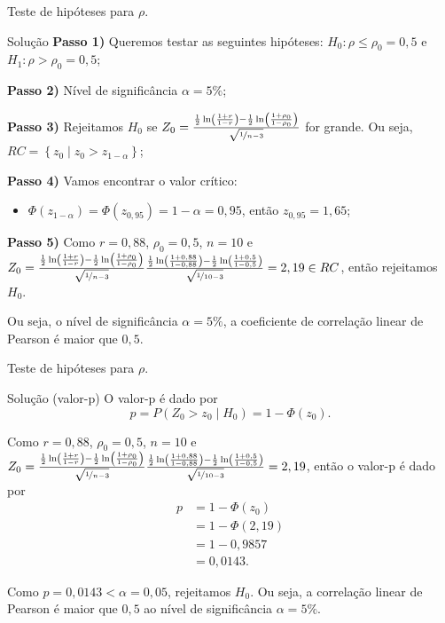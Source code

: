 \documentclass[9pt]{beamer}
\begin{document}
\begin{frame}{Teste de hipóteses para $\rho$.}

\begin{block}{Solução}
	\textbf{Passo 1)} Queremos testar as seguintes hipóteses: $H_0: \rho \leq \rho_0= 0,5$ e $H_1: \rho > \rho_0= 0,5$;
	
	\textbf{Passo 2)} Nível de significância $\alpha=5\%$;
	
	\textbf{Passo 3)} Rejeitamos $H_0$ se $Z_0 =  \frac{\frac{1}{2} \ln\left( \frac{1+r}{1-r} \right) - \frac{1}{2} \ln\left( \frac{1 + \rho_0}{1 - \rho_0} \right) }{\sqrt{\nicefrac{1}{n - 3}}}$ for grande. Ou seja, $RC = \left\{ z_0 \mid z_0 > z_{1-\alpha} \right\}$;
	
	\textbf{Passo 4)} Vamos encontrar o valor crítico:
	\begin{itemize}
		\item $\Phi\left( z_{1-\alpha} \right) = \Phi\left( z_{0,95} \right) = 1-\alpha = 0,95$, então $z_{0,95} = 1,65$;
	\end{itemize}

	\textbf{Passo 5)} Como $r = 0,88$, $\rho_0 = 0,5$, $n = 10$ e $Z_0 =  \frac{\frac{1}{2} \ln\left( \frac{1+r}{1-r} \right) - \frac{1}{2} \ln\left( \frac{1 + \rho_0}{1 - \rho_0} \right) }{\sqrt{\nicefrac{1}{n - 3}}}\allowbreak \frac{\frac{1}{2} \ln\left( \frac{1 + 0,88}{1 - 0,88} \right) - \frac{1}{2} \ln\left( \frac{1 + 0,5}{1 - 0,5} \right) }{\sqrt{\nicefrac{1}{10 - 3}}} = 2, 19 \in RC$, então rejeitamos $H_0$.
	
	Ou seja, o nível de significância $\alpha=5\%$, a coeficiente de correlação linear de Pearson é maior que $0,5$.
\end{block}

\end{frame}

\begin{frame}{Teste de hipóteses para $\rho$.}

\begin{block}{Solução (valor-p)}
	O valor-p é dado por
	$$p = P(Z_0 > z_0 \mid H_0) = 1 - \Phi(z_0).$$
	
	 Como $r = 0,88$, $\rho_0 = 0,5$, $n = 10$ e $Z_0 =  \frac{\frac{1}{2} \ln\left( \frac{1+r}{1-r} \right) - \frac{1}{2} \ln\left( \frac{1 + \rho_0}{1 - \rho_0} \right) }{\sqrt{\nicefrac{1}{n - 3}}}\allowbreak \frac{\frac{1}{2} \ln\left( \frac{1 + 0,88}{1 - 0,88} \right) - \frac{1}{2} \ln\left( \frac{1 + 0,5}{1 - 0,5} \right) }{\sqrt{\nicefrac{1}{10 - 3}}} = 2, 19$, então o valor-p é dado por
	 \begin{align*}
		 p &= 1 - \Phi(z_0)\\
		 &= 1 - \Phi(2,19)\\
		 &= 1 - 0,9857\\
		 &= 0,0143.
	 \end{align*}
	 
	 Como $p = 0,0143 < \alpha = 0,05$, rejeitamos $H_0$. Ou seja, a correlação linear de Pearson é maior que $0,5$ ao nível de significância $\alpha=5\%$.
\end{block}

\end{frame}
\end{document}
